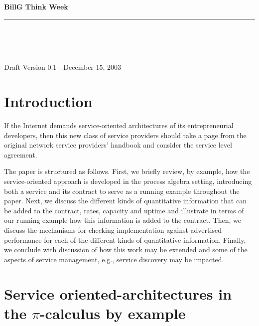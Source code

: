 \documentclass{amsart}
\theoremstyle{definition}
\theoremstyle{remark}
\numberwithin{equation}{subsection}
\newcommand{\paperversion}{Draft Version 0.1 - December 15, 2003}
\newenvironment{toc}
{
\begin{list}{}{
   \setlength{\leftmargin}{0.4in}
   \setlength{\rightmargin}{0.6in}
   \setlength{\parskip}{0pt}
 } \item }
{\end{list}}
\begin{document}
\noindent
{\large \textbf{
BillG Think Week}}\\
\rule{6.25in}{0.75pt}\\\\\\

\maketitle

\begin{center}
\paperversion\\
\end{center}

\begin{toc}
\tableofcontents
\end{toc}

\newpage

\section{Introduction}

If the Internet demands service-oriented architectures of its
entrepreneurial developers, then this new class of service providers
should take a page from the original network service providers'
handbook and consider the service level agreement.

The paper is structured as follows. First, we briefly review, by
example, how the service-oriented approach is developed in the process
algebra setting, introducing both a service and its contract to serve
as a running example throughout the paper. Next, we discuss the
different kinds of quantitative information that can be added to the
contract, rates, capacity and uptime and illustrate in terms of our
running example how this information is added to the contract. Then,
we discuss the mechanisms for checking implementation against
advertised performance for each of the different kinds of quantitative
information. Finally, we conclude with discussion of how this work may
be extended and some of the aspects of service management, e.g.,
service discovery may be impacted.


\section{Service oriented-architectures in the $\pi$-calculus by example}
\end{document}
